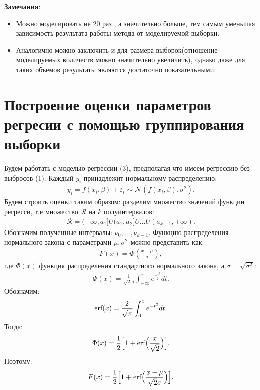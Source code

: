\documentclass[12pt]{article}
\begin{document}
 \hfill\break
\textbf{Замечания}:
\begin{itemize}
    \item Можно моделировать не 20 раз , а значительно больше, тем самым уменьшая зависимость результата работы метода от моделируемой выборки.\\
    \item Аналогично можно заключить и для размера выборок(отношение моделируемых количеств можно значительно увеличить), однако даже для таких объемов результаты являются достаточно показательными.
\end{itemize}
\newpage
\section{Построение оценки параметров регресии с помощью группирования выборки}
Будем работать с моделью регрессии (3), предполагая что имеем регрессию без выбросов (1). 
Каждый $y_i$ принадлежит нормальному распределению:
\begin{eqnarray}
    y_i=f(x_i,\beta)+\varepsilon_i \sim \mathcal{N}(f(x_i,\beta),\sigma^2).
\end{eqnarray}
Будем строить оценки таким образом: разделим множество значений функции регресси, т.е множество $\mathcal{R}$ на $k$ полуинтервалов:
\begin{eqnarray}
    \mathcal{R}=(-\infty,a_1]U(a_1,a_2]U\dots U(a_{k-1},+\infty ).
\end{eqnarray}
Обозначим полученные интервалы: $\nu_0,\dots,\nu_{k-1}$.\hfill\break
Функцию распределения нормального закона с параметрами $\mu,\sigma^2$ можно представить как:
\begin{eqnarray}
    F(x)=\Phi(\frac{x-\mu}{\sigma}),
\end{eqnarray}
где $\Phi(x)$ функция распределения стандартного нормального закона, а $\sigma = \sqrt{\sigma^2}$:
\begin{eqnarray}
    \Phi(x)=\frac{1}{\sqrt{2}\sigma}\int_{-\infty}^{x}e^{\frac{-t^2}{2}}dt.
\end{eqnarray}
Обозначим:
\begin{eqnarray}
    \textup{erf}(x)=\frac{2}{\sqrt{\pi}}\int_0^{x}e^{-t^2}dt.
\end{eqnarray}
Тогда:
\begin{eqnarray}
    \Phi(x)= \frac{1}{2} \Big[1+\textup{erf}\Big(\frac{x}{\sqrt{2}} \Big) \Big].
\end{eqnarray}
Поэтому:
\begin{eqnarray}
    F(x)= \frac{1}{2} \Big[1+\textup{erf}\Big(\frac{x-\mu}{\sqrt{2}\sigma} \Big) \Big].
\end{eqnarray}
\end{document}
